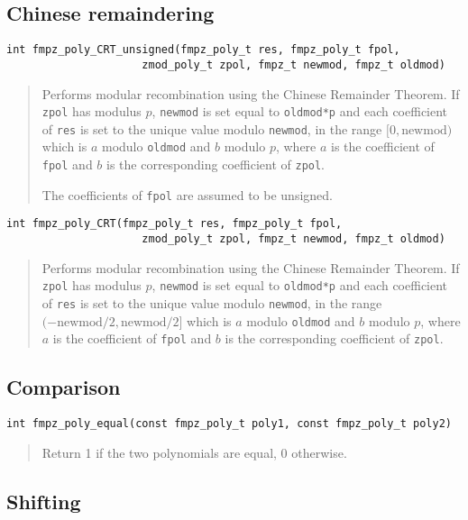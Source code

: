 \documentclass[a4paper,10pt]{article}
\newcommand{\code}{\lstinline}
\begin{document}
\subsection{Chinese remaindering}

\begin{lstlisting}
int fmpz_poly_CRT_unsigned(fmpz_poly_t res, fmpz_poly_t fpol, 
                     zmod_poly_t zpol, fmpz_t newmod, fmpz_t oldmod)
\end{lstlisting}
\begin{quote}
Performs modular recombination using the Chinese Remainder Theorem. If \code{zpol} has modulus $p$, \code{newmod} is set equal to \code{oldmod*p} and each coefficient of \code{res} is set to the unique value modulo \code{newmod}, in the range $[0, \mbox{newmod})$ which is $a$ modulo \code{oldmod} and $b$ modulo $p$, where $a$ is the coefficient of \code{fpol} and $b$ is the corresponding coefficient of \code{zpol}.

The coefficients of \code{fpol} are assumed to be unsigned. 
\end{quote}

\begin{lstlisting}
int fmpz_poly_CRT(fmpz_poly_t res, fmpz_poly_t fpol, 
                     zmod_poly_t zpol, fmpz_t newmod, fmpz_t oldmod)
\end{lstlisting}
\begin{quote}
Performs modular recombination using the Chinese Remainder Theorem. If \code{zpol} has modulus $p$, \code{newmod} is set equal to \code{oldmod*p} and each coefficient of \code{res} is set to the unique value modulo \code{newmod}, in the range $(-\mbox{newmod}/2, \mbox{newmod}/2]$ which is $a$ modulo \code{oldmod} and $b$ modulo $p$, where $a$ is the coefficient of \code{fpol} and $b$ is the corresponding coefficient of \code{zpol}. 
\end{quote}

\subsection{Comparison}


\begin{lstlisting}
int fmpz_poly_equal(const fmpz_poly_t poly1, const fmpz_poly_t poly2) 
\end{lstlisting}
\begin{quote}
Return 1 if the two polynomials are equal, 0 otherwise.
\end{quote}


\subsection{Shifting}
\end{document}
